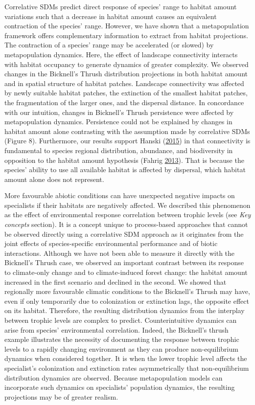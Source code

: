 \documentclass[12pt]{article}
\begin{document}
Correlative SDMs predict direct response of species' range to habitat
amount variations such that a decrease in habitat amount causes an
equivalent contraction of the species' range. However, we have shown
that a metapopulation framework offers complementary information to
extract from habitat projections. The contraction of a species' range
may be accelerated (or slowed) by metapopulation dynamics. Here, the
effect of landscape connectivity interacts with habitat occupancy to
generate dynamics of greater complexity. We observed changes in the
Bicknell's Thrush distribution projections in both habitat amount and in
spatial structure of habitat patches. Landscape connectivity was
affected by newly suitable habitat patches, the extinction of the
smallest habitat patches, the fragmentation of the larger ones, and the
dispersal distance. In concordance with our intuition, changes in
Bicknell's Thrush persistence were affected by metapopulation dynamics.
Persistence could not be explained by changes in habitat amount alone
contrasting with the assumption made by correlative SDMs (Figure 8).
Furthermore, our results support Hanski
(\protect\hyperlink{ref-hanski_habitat_2015}{2015}) in that connectivity
is fundamental to species regional distribution, abundance, and
biodiversity in opposition to the habitat amount hypothesis (Fahrig
\protect\hyperlink{ref-fahrig_rethinking_2013}{2013}). That is because
the species' ability to use all available habitat is affected by
dispersal, which habitat amount alone does not represent.

More favourable abiotic conditions can have unexpected negative impacts
on specialists if their habitats are negatively affected. We described
this phenomenon as the effect of environmental response correlation
between trophic levels (see \emph{Key concepts} section). It is a
concept unique to process-based approaches that cannot be observed
directly using a correlative SDM approach as it originates from the
joint effects of species-specific environmental performance and of
biotic interactions. Although we have not been able to measure it
directly with the Bicknell's Thrush case, we observed an important
contrast between its response to climate-only change and to
climate-induced forest change: the habitat amount increased in the first
scenario and declined in the second. We showed that regionally more
favourable climatic conditions to the Bicknell's Thrush may have, even
if only temporarily due to colonization or extinction lags, the opposite
effect on its habitat. Therefore, the resulting distribution dynamics
from the interplay between trophic levels are complex to predict.
Counterintuitive dynamics can arise from species' environmental
correlation. Indeed, the Bicknell's thrush example illustrates the
necessity of documenting the response between trophic levels to a
rapidly changing environment as they can produce non-equilibrium
dynamics when considered together. It is when the lower trophic level
affects the specialist's colonization and extinction rates
asymmetrically that non-equilibrium distribution dynamics are observed.
Because metapopulation models can incorporate such dynamics on
specialists' population dynamics, the resulting projections may be of
greater realism.
\end{document}
